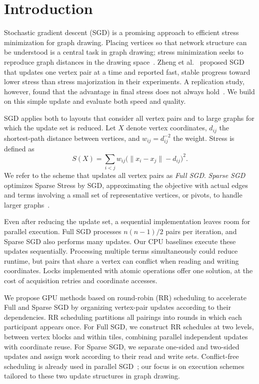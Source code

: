\section{Introduction}
\label{sec:introduction}
Stochastic gradient descent (SGD) is a promising approach to efficient stress minimization for graph drawing.
Placing vertices so that network structure can be understood is a central task in graph drawing; stress minimization seeks to reproduce graph distances in the drawing space~\cite{ref11,ref16}.
Zheng et al.~\cite{ref28} proposed SGD that updates one vertex pair at a time and reported fast, stable progress toward lower stress than stress majorization in their experiments.
A replication study, however, found that the advantage in final stress does not always hold~\cite{ref2}.
We build on this simple update and evaluate both speed and quality.

SGD applies both to layouts that consider all vertex pairs and to large graphs for which the update set is reduced.
Let $X$ denote vertex coordinates, $d_{ij}$ the shortest-path distance between vertices, and $w_{ij}=d_{ij}^{-2}$ the weight.
Stress is defined as
\begin{equation}
S(X)=\sum_{i<j}w_{ij}\bigl(\lVert x_i-x_j\rVert-d_{ij}\bigr)^2.
\label{eq:stress}
\end{equation}
We refer to the scheme that updates all vertex pairs as \emph{Full SGD}.
\emph{Sparse SGD} optimizes Sparse Stress by SGD, approximating the objective with actual edges and terms involving a small set of representative vertices, or pivots, to handle larger graphs~\cite{ref20,ref28}.

Even after reducing the update set, a sequential implementation leaves room for parallel execution.
Full SGD processes $n(n-1)/2$ pairs per iteration, and Sparse SGD also performs many updates.
Our CPU baselines execute these updates sequentially.
Processing multiple terms simultaneously could reduce runtime, but pairs that share a vertex can conflict when reading and writing coordinates.
Locks implemented with atomic operations offer one solution, at the cost of acquisition retries and coordinate accesses.

We propose GPU methods based on round-robin (RR) scheduling to accelerate Full and Sparse SGD by organizing vertex-pair updates according to their dependencies.
RR scheduling partitions all pairings into rounds in which each participant appears once.
For Full SGD, we construct RR schedules at two levels, between vertex blocks and within tiles, combining parallel independent updates with coordinate reuse.
For Sparse SGD, we separate one-sided and two-sided updates and assign work according to their read and write sets.
Conflict-free scheduling is already used in parallel SGD~\cite{ref15,ref21,ref30}; our focus is on execution schemes tailored to these two update structures in graph drawing.

